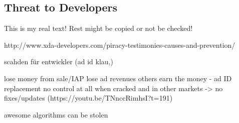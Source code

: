 \subsection{Threat to Developers} \label{subsection:foundation-piracy-developers}
This is my real text! Rest might be copied or not be checked!

http://www.xda-developers.com/piracy-testimonies-causes-and-prevention/

scahden für entwickler (ad id klau,)\newline

lose money from sale/IAP\newline
lose ad revenues\newline
others earn the money  - ad ID replacement\newline
no control at all when cracked and in other markets -> no fixes/updates (https://youtu.be/TNnccRimhsI?t=191)\newline

awesome algorithms can be stolen\newline
